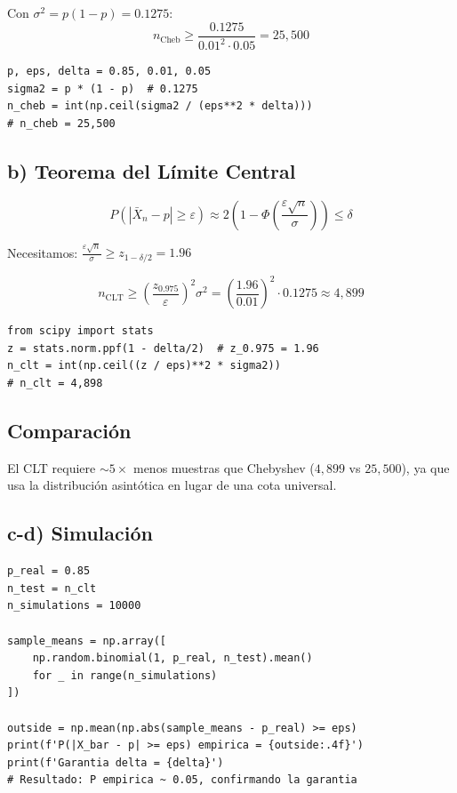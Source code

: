 \documentclass[11pt,a4paper]{article}
\begin{document}
Con $\sigma^2 = p(1-p) = 0.1275$:
\[\boxed{n_{\text{Cheb}} \geq \frac{0.1275}{0.01^2 \cdot 0.05} = 25{,}500}\]

\begin{lstlisting}[caption={Cálculo tamaño de muestra — Chebyshev}]
p, eps, delta = 0.85, 0.01, 0.05
sigma2 = p * (1 - p)  # 0.1275
n_cheb = int(np.ceil(sigma2 / (eps**2 * delta)))
# n_cheb = 25,500
\end{lstlisting}

\subsection{b) Teorema del Límite Central}

\[P(|\bar{X}_n - p| \geq \varepsilon) \approx 2\left(1 - \Phi\left(\frac{\varepsilon\sqrt{n}}{\sigma}\right)\right) \leq \delta\]

Necesitamos: $\frac{\varepsilon\sqrt{n}}{\sigma} \geq z_{1-\delta/2} = 1.96$

\[\boxed{n_{\text{CLT}} \geq \left(\frac{z_{0.975}}{\varepsilon}\right)^2 \sigma^2 = \left(\frac{1.96}{0.01}\right)^2 \cdot 0.1275 \approx 4{,}899}\]

\begin{lstlisting}[caption={Cálculo tamaño de muestra — CLT}]
from scipy import stats
z = stats.norm.ppf(1 - delta/2)  # z_0.975 = 1.96
n_clt = int(np.ceil((z / eps)**2 * sigma2))
# n_clt = 4,898
\end{lstlisting}

\subsection{Comparación}
El CLT requiere $\sim 5\times$ menos muestras que Chebyshev ($4{,}899$ vs $25{,}500$), ya que usa la distribución asintótica en lugar de una cota universal.

\subsection{c-d) Simulación}

\begin{lstlisting}[caption={Simulación para verificar garantía CLT}]
p_real = 0.85
n_test = n_clt
n_simulations = 10000

sample_means = np.array([
    np.random.binomial(1, p_real, n_test).mean()
    for _ in range(n_simulations)
])

outside = np.mean(np.abs(sample_means - p_real) >= eps)
print(f'P(|X_bar - p| >= eps) empirica = {outside:.4f}')
print(f'Garantia delta = {delta}')
# Resultado: P empirica ~ 0.05, confirmando la garantia
\end{lstlisting}
\end{document}
